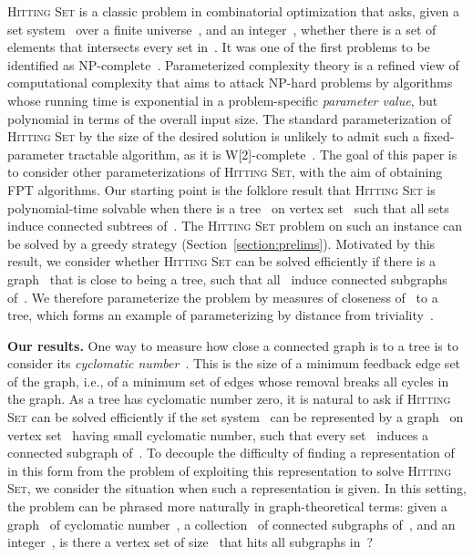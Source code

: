 \let\accentvec\vec  \documentclass{llncs}
\newcommand{\HittingSet}{\textsc{Hitting Set}\xspace}
\begin{document}
\HittingSet is a classic problem in combinatorial optimization that asks, given a set system~ over a finite universe~, and an integer~, whether there is a set of~ elements that intersects every set in~. It was one of the first problems to be identified as NP-complete~\cite{Karp72}. Parameterized complexity theory is a refined view of computational complexity that aims to attack NP-hard problems by algorithms whose running time is exponential in a problem-specific \emph{parameter value}, but polynomial in terms of the overall input size. The standard parameterization of \HittingSet by the size of the desired solution is unlikely to admit such a fixed-parameter tractable algorithm, as it is W[2]-complete~\cite{DowneyF13}. The goal of this paper is to consider other parameterizations of \HittingSet, with the aim of obtaining FPT algorithms. Our starting point is the folklore result that \HittingSet is polynomial-time solvable when there is a tree~ on vertex set~ such that all sets~ induce connected subtrees of~. The \HittingSet problem on such an instance can be solved by a greedy strategy (Section~\ref{section:prelims}). Motivated by this result, we consider whether \HittingSet can be solved efficiently if there is a graph~ that is close to being a tree, such that all~ induce connected subgraphs of~. We therefore parameterize the problem by measures of closeness of~ to a tree, which forms an example of parameterizing by distance from triviality~\cite{Niedermeier10}.

\textbf{Our results.} 
One way to measure how close a connected graph is to a tree is to consider its \emph{cyclomatic number}~. This is the size of a minimum feedback edge set of the graph, i.e., of a minimum set of edges whose removal breaks all cycles in the graph. As a tree has cyclomatic number zero, it is natural to ask if \HittingSet can be solved efficiently if the set system~ can be represented by a graph~ on vertex set~ having small cyclomatic number, such that every set~ induces a connected subgraph of~. To decouple the difficulty of finding a representation of~ in this form from the problem of exploiting this representation to solve \HittingSet, we consider the situation when such a representation is given. In this setting, the problem can be phrased more naturally in graph-theoretical terms: given a graph~ of cyclomatic number~, a collection~ of connected subgraphs of~, and an integer~, is there a vertex set of size~ that hits all subgraphs in~? 
\end{document}
